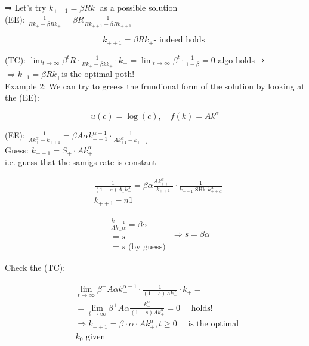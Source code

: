 \documentclass[10pt]{article}
\begin{document}
⇒ Let's try $k_{++1}=\beta R k_{+}$as a possible solution\\
(EE): $\frac{1}{R k_{+}-\beta R k_{+}}=\beta R \frac{1}{R k_{++1}-\beta R k_{++1}}$

$$
k_{++1}=\beta R k_{+} \text {- indeed holds }
$$

(TC): $\lim _{t \rightarrow \infty} \beta^{t} R \cdot \frac{1}{R k_{+}-\beta k k_{+}} \cdot k_{+}=\lim _{t \rightarrow \infty} \beta^{t} \cdot \frac{1}{1-\beta}=0$ algo holds ⇒\\
$\Rightarrow k_{+1}=\beta R k_{+}$is the optimal poth!\\
Example 2: We can try to greess the frundional form of the solution by looking at the (EE):

$$
u(c)=\log (c), \quad f(k)=A k^{\alpha}
$$

(EE): $\frac{1}{A k_{+}^{\alpha}-k_{++1}}=\beta A \alpha k_{++1}^{\alpha-1} \cdot \frac{1}{A k_{+1}^{\alpha}-k_{++2}}$\\
Guess: $k_{++1}=S_{+} \cdot A k_{+}^{\alpha}$\\
i.e. guess that the samigs rate is constant

$$
\begin{aligned}
& \frac{1}{(1-s) A_{1} k_{+}^{\alpha}}=\beta \alpha \frac{A k_{+++}^{\alpha}}{k_{++1}} \cdot \frac{1}{k_{+-1} \text { SHk } k_{++\alpha}^{\alpha}} \\
& k_{++1}-n 1
\end{aligned}
$$

$$
\begin{aligned}
& \frac{k_{++1}}{A k_{+} \alpha}=\beta \alpha \\
& =s \\
& =s \text { (by guess) }
\end{aligned} \Rightarrow s=\beta \alpha
$$

Check the (TC):

$$
\begin{aligned}
& \lim _{t \rightarrow \infty} \beta^{+} A \alpha k_{+}^{\alpha-1} \cdot \frac{1}{(1-s) A k_{+}^{\alpha}} \cdot k_{+}= \\
& =\lim _{t \rightarrow \infty} \beta^{+} A \alpha \frac{k_{+}^{\alpha}}{(1-s) A k_{+}^{\alpha}}=0 \quad \text { holds! } \\
& \Rightarrow k_{++1}=\beta \cdot \alpha \cdot A k_{+}^{\alpha}, t \geq 0 \quad \text { is the optimal } \\
& k_{0} \text { given }
\end{aligned}
$$
\end{document}
